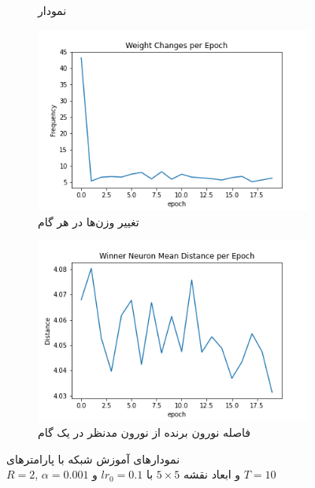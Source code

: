 \documentclass[12pt, a4paper]{article}
\begin{document}
\begin{figure}[h]
\begin{subfigure}{0.45\linewidth}
        \caption{نمودار }
    \end{subfigure}
    \newline
    \begin{subfigure}{0.45\linewidth}
        \includegraphics[width=\linewidth]{images/q5/r1/weight_change.png}
        \caption{تغییر وزن‌ها در هر گام}
    \end{subfigure}
    \hfill
    \begin{subfigure}{0.45\linewidth}
        \includegraphics[width=\linewidth]{images/q5/r1/winner_distance.png}
        \caption{فاصله نورون برنده از نورون مدنظر در یک گام}
    \end{subfigure}
    \caption{نمودار‌های آموزش شبکه  با پارامتر‌های \\$R=2$, $\alpha=0.001$ و ابعاد نقشه $5 \times 5$ با $lr_0=0.1$ و $T=10$}
    \label{r1}
\end{figure}
\end{document}
